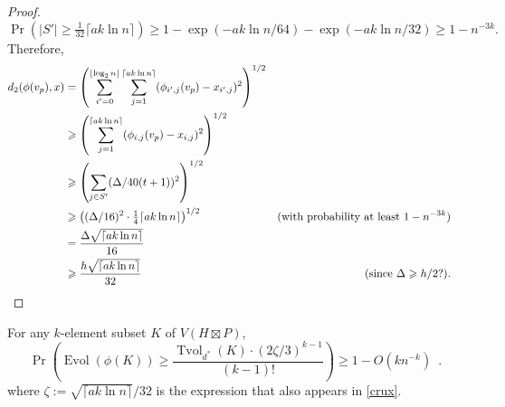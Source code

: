 \documentclass{patmorin}
\renewcommand{\ge}{\geqslant}
\DeclareMathOperator{\evol}{Evol}
\DeclareMathOperator{\tvol}{Tvol}
\begin{document}
\begin{proof}
  \[
    \Pr(|S'|\ge \tfrac{1}{32}\lceil a k\ln n\rceil)\ge 1-\exp(-ak\ln n/64)-\exp(-ak\ln n/32)\ge 1-n^{-3k}.
  \]
  Therefore,
  \begin{align*}
    d_2(\phi(v_p),x)
    & = \left(\sum_{i'=0}^{\lfloor\log_2 n\rfloor}\sum_{j=1}^{\lceil ak\ln  n\rceil}(\phi_{i',j}(v_p)-x_{i',j})^2\right)^{1/2} \\
    & \ge \left(\sum_{j=1}^{\lceil ak\ln  n\rceil}(\phi_{i,j}(v_p)-x_{i,j})^2\right)^{1/2} \\
    & \ge \left(\sum_{j\in S'}(\Delta/40(t+1))^2\right)^{1/2} \\
    & \ge \left((\Delta/16)^2\cdot \tfrac{1}{4}\lceil ak\ln  n\rceil\right)^{1/2}
      & \text{(with probability at least $1-n^{-3k}$)} \\
    & = \frac{\Delta\sqrt{\lceil ak\ln  n\rceil}}{16} \\
    & \ge \frac{h\sqrt{\lceil ak\ln n\rceil}}{32}
     & \text{(since $\Delta\ge h/2?$)}. &
    \qedhere
  \end{align*}
\end{proof}

\begin{lem}\label{volume_preserver}
  For any $k$-element subset $K$ of $V(H\boxtimes P)$,
  \[
    \Pr\left(\evol(\phi(K)) \ge \frac{\tvol_{d^*}(K)\cdot(2\zeta/3)^{k-1}}{(k-1)!}\right) \ge 1- O(kn^{-k}) \enspace .
  \]
  where $\zeta:=\sqrt{\lceil ak\ln n\rceil}/32$ is the expression that also appears in \cref{crux}.
\end{lem}
\end{document}
